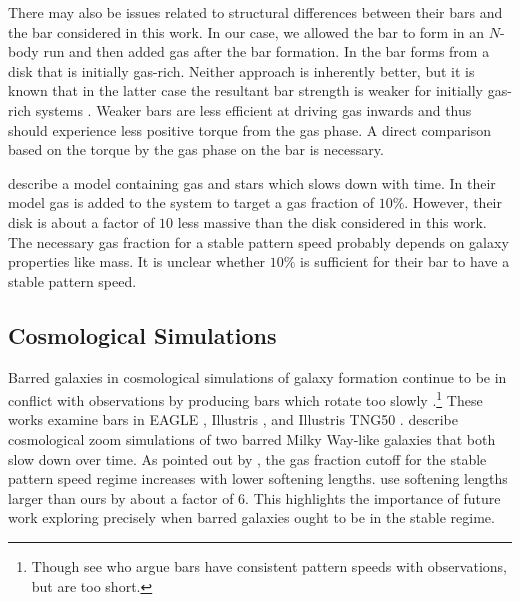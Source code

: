\documentclass[twocolumn,linenumbers,trackchanges]{aastex631}
\begin{document}
There may also be issues related to structural differences between their
bars and the bar considered in this work. In our case, we allowed the bar to
form in an $N$-body run and then added gas after the bar formation. In
\citet{2013MNRAS.429.1949A, 2014MNRAS.438L..81A} the bar forms from a disk that
is initially gas-rich. Neither approach is inherently better, but it is known
that in the latter case the resultant bar strength is weaker for initially
gas-rich systems \citep[e.g.,][]{2013MNRAS.429.1949A}. Weaker bars are less
efficient at driving gas inwards \citep{2004ApJ...600..595R} and thus should
experience less positive torque from the gas phase. A direct comparison based on
the torque by the gas phase on the bar is necessary.

\citet{2015MNRAS.454.3166A} describe a model containing gas and stars which
slows down with time. In their model gas is added to the system to target a gas
fraction of $10\%$. However, their disk is about a factor of $10$ less massive
than the disk considered in this work. The necessary gas fraction for a stable
pattern speed probably depends on galaxy properties like mass. It is unclear
whether $10\%$ is sufficient for their bar to have a stable pattern speed.

\subsection{Cosmological Simulations}
Barred galaxies in cosmological simulations of galaxy formation continue to be
in conflict with observations by producing bars which rotate too slowly
\citep{2017MNRAS.469.1054A, 2019MNRAS.483.2721P, 2021AA...650L..16F,
2022ApJ...940...61F}.\footnote{Though see \citet{2022ApJ...940...61F} who argue
bars have consistent pattern speeds with observations, but are too short.}
These works examine bars in EAGLE \citep{2015MNRAS.450.1937C,
2015MNRAS.446..521S}, Illustris \citep{2014Natur.509..177V,
2014MNRAS.444.1518V}, and Illustris TNG50 \citep{2019MNRAS.490.3196P,
2019MNRAS.490.3234N}. \citet{2015PASJ...67...63O} describe cosmological zoom
simulations of two barred Milky Way-like galaxies that both slow down over time.
As pointed out by \citet{2010ApJ...719.1470V}, the gas fraction cutoff for the
stable pattern speed regime increases with lower softening lengths.
\citet{2015PASJ...67...63O} use softening lengths larger than ours by about a
factor of $6$. This highlights the importance of future work exploring precisely
when barred galaxies ought to be in the stable regime.
\end{document}
